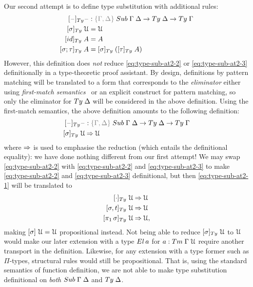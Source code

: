 \documentclass[a4paper,UKenglish,numberwithinsect,cleveref,thm-restate]{lipics-v2021}
\newcommand{\LT}[2][]{\todo[inline,author={L-T},caption={},#1]{#2}}
\begin{document}
Our second attempt is to define type substitution with additional rules:
\begin{alignat}{3}
[\blank]_{\Ty} \blank &: \implicit{\Gamma, \Delta} \; \Sub\;\Gamma\;\Delta \to \Ty\;\Delta \to \Ty\;\Gamma \nonumber \\
[ \sigma ]_{\Ty}       \;\UU  & = \UU                                   \label{eq:type-sub-at2-1} \\
[ \idS ]_{\Ty}         \;A    & = A                                     \label{eq:type-sub-at2-2} \\
[ \sigma ; \tau ]_{\Ty}\;A    & = [ \sigma ]_{\Ty}\;([ \tau ]_{\Ty}\;A) \label{eq:type-sub-at2-3}
\end{alignat}
However, this definition does \emph{not} reduce \eqref{eq:type-sub-at2-2} or \eqref{eq:type-sub-at2-3} definitionally in a type-theoretic proof assistant.
By design, definitions by pattern matching will be translated to a form that corresponds to the \emph{eliminator} either using \emph{first-match semantics}~\cite{Cockx2020a} or an explicit construct for pattern matching, so only the eliminator for $\Ty\;\Delta$ will be considered in the above definition.
\LT[noinline]{How about \Coq and \Lean?}
Using the first-match semantics, the above definition amounts to the following definition:
\begin{alignat*}{3}
[\blank]_{\Ty} \blank &: \implicit{\Gamma, \Delta} \; \Sub\;\Gamma\;\Delta \to \Ty\;\Delta \to \Ty\;\Gamma \\
[ \sigma ]_{\Ty}\;\UU  & \reduce \UU
\end{alignat*}
where $\mathbin{\Rightarrow}$ is used to emphasise the reduction (which entails the definitional equality): we have done nothing different from our first attempt! 
We may swap \eqref{eq:type-sub-at2-2} with \eqref{eq:type-sub-at2-2} and \eqref{eq:type-sub-at2-3} to make \eqref{eq:type-sub-at2-2} and \eqref{eq:type-sub-at2-3} definitional, but then \eqref{eq:type-sub-at2-1} will be translated to 
\begin{alignat*}{3}
[ \emptysub ]_{\Ty}\;\UU         & \reduce \UU \\
[ \sigma, t ]_{\Ty}\;\UU         & \reduce \UU \\
[ \pi_1\,\sigma ]_{\Ty}\;\UU     & \reduce \UU,
\end{alignat*}
making $[\sigma]\;\mathcal{U} = \mathcal{U}$ propositional instead.
Not being able to reduce $[ \sigma ]_{\Ty}\;\UU$ to $\mathcal{U}$ would make our later extension with a type $\El\,a$ for $a : \Tm\;\Gamma\;\UU$ require another transport in the definition.
Likewise, for any extension with a type former such as $\Pi$-types, structural rules would still be propositional.
That is, using the standard semantics of function definition, we are not able to make type substitution definitional on \emph{both} $\Sub\;\Gamma\;\Delta$ and $\Ty\;\Delta$.
\end{document}
